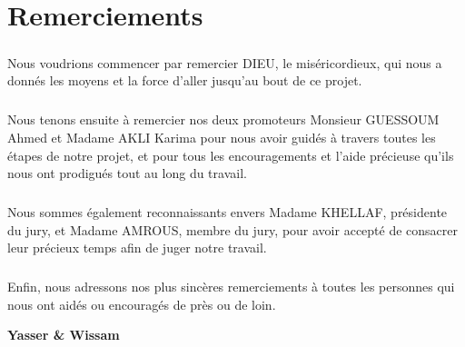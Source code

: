\chapter*{Remerciements}    

\vspace{1.5cm}
\paragraph{}
Nous voudrions commencer par remercier DIEU, le miséricordieux, qui nous a donnés les moyens et la force d'aller jusqu'au bout de ce projet.
\paragraph{}
Nous tenons ensuite à remercier nos deux promoteurs Monsieur GUESSOUM Ahmed et Madame AKLI Karima pour nous avoir guidés à travers toutes les étapes de notre projet, et pour tous les encouragements et l'aide précieuse qu'ils nous ont prodigués tout au long du travail.
\paragraph{}
Nous sommes également reconnaissants envers Madame KHELLAF, présidente du jury, et Madame AMROUS, membre du jury, pour avoir accepté de consacrer leur précieux temps afin de juger notre travail.
\paragraph{}
Enfin, nous adressons nos plus sincères remerciements à toutes les personnes qui nous ont aidés ou encouragés de près ou de loin.
\vspace{0.5cm}
\begin{center}
	\Large
	\hspace{8.5cm}
	\textbf{Yasser \& Wissam}
\end{center}